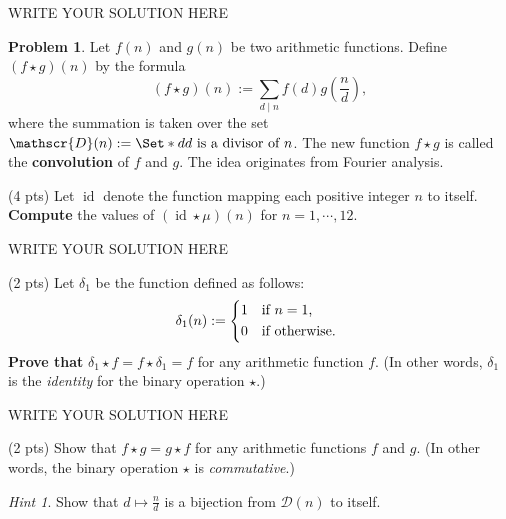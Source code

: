 \documentclass[11pt]{article}
\theoremstyle{plain}
\theoremstyle{definition}
\newtheorem{problem}{Problem}
\theoremstyle{remark}
\newtheorem*{hint}{Hint}
\numberwithin{equation}{problem}
\DeclareMathOperator{\id}{id} %
\providecommand\given{}
\begin{document}
\begin{solution} %
WRITE YOUR SOLUTION HERE
\end{solution}\clearpage %


\begin{problem}
	Let $f(n)$ and $g(n)$ be two arithmetic functions. Define $(f \star g)(n)$ by the formula 
	\[
		(f \star g)(n) := \sum_{d\mid n} f(d)g(\frac{n}{d}),
	\]
	where the summation is taken over the set $\mathscr{D}(n):=\Set*{ d \given d \text{ is a divisor of } n }$. 
	The new function $f \star g$ is called the \textbf{convolution} of $f$ and $g$. The idea originates from Fourier analysis.
	\begin{listinprob}
		\item (4 pts) Let $\id$ denote the function mapping each positive integer $n$ to itself. \textbf{Compute} the values of $(\id \star \mu)(n)$ for $n=1,\cdots,12$.
		
\begin{solution} %
WRITE YOUR SOLUTION HERE
\end{solution}\clearpage %

		\item (2 pts) Let $\delta_{1}$ be the function defined as follows:
		\[
			\delta_{1}(n) := 
			\begin{dcases*}
				1 & if $n=1$,\\
				0 & if otherwise.
			\end{dcases*}
		\]
		\textbf{Prove that} $\delta_{1}\star f = f\star\delta_{1} = f$ for any arithmetic function $f$.
		(In other words, $\delta_{1}$ is the \emph{identity} for the binary operation $\star$.)
		
\begin{solution} %
WRITE YOUR SOLUTION HERE
\end{solution}\clearpage %

		\item (2 pts) Show that $f\star g = g\star f$ for any arithmetic functions $f$ and $g$. (In other words, the binary operation $\star$ is \emph{commutative}.)
		\begin{hint}
			Show that $d\mapsto \frac{n}{d}$ is a bijection from $\mathscr{D}(n)$ to itself.
		\end{hint}
		

\end{listinprob}
\end{problem}
\end{document}

